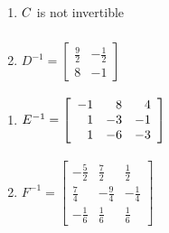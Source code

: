 \documentclass{ximera}
\begin{document}
\begin{multicols}{2} 
\begin{enumerate}
\setcounter{enumi}{\value{HW}}

\item $C \vphantom{\left[ \begin{array}{rr} \frac{9}{2} & -\frac{1}{2} \\ 8 & -1 \end{array} \right]}$ is not invertible
\item $D^{-1} = \left[ \begin{array}{rr} \frac{9}{2} & -\frac{1}{2} \\ 8 & -1 \end{array} \right]$

\setcounter{HW}{\value{enumi}}
\end{enumerate}
\end{multicols}

\begin{multicols}{2} 
\begin{enumerate}
\setcounter{enumi}{\value{HW}}

\item $E^{-1} = \left[ \begin{array}{rrr} -1 & 8 & 4 \\ 1 & -3 & -1 \\ 1 & -6 & -3 \end{array} \right] \vphantom{\left[ \begin{array}{rrr} -\frac{5}{2} & \frac{7}{2} & \frac{1}{2} \\[3pt] \frac{7}{4} & -\frac{9}{4} & -\frac{1}{4} \\[3pt] -\frac{1}{6} & \frac{1}{6} & \frac{1}{6} \end{array} \right]}$
\item $F^{-1} = \left[ \begin{array}{rrr} -\frac{5}{2} & \frac{7}{2} & \frac{1}{2} \\[3pt] \frac{7}{4} & -\frac{9}{4} & -\frac{1}{4} \\[3pt] -\frac{1}{6} & \frac{1}{6} & \frac{1}{6} \end{array} \right]$

\setcounter{HW}{\value{enumi}}
\end{enumerate}
\end{multicols}
\end{document}
